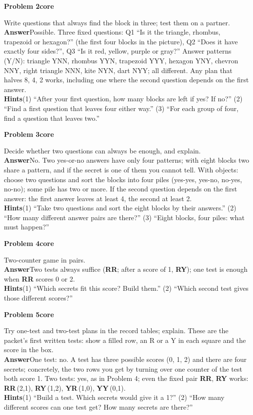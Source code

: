 \documentclass[11pt]{article}
\newcommand{\cd}[1]{\mbox{\textsf{\textbf{#1}}}}   %
\newcommand{\core}{\textcolor{tagcore}{\textbf{core}}}
\newcommand{\pb}[3]{\par\needspace{5\baselineskip}\medskip\textbf{Problem #1}\enspace{\small page #2}\enspace\textperiodcentered\enspace #3\par\nopagebreak}
\newcommand{\lab}[1]{\textbf{#1}\enspace}
\newcommand{\hints}[1]{\lab{Hints}#1}
\begin{document}
\pb{2}{2}{\core}
Write questions that always find the block in three; test them on a partner.\\
\lab{Answer}Possible. Three fixed questions: Q1 ``Is it the triangle, rhombus, trapezoid or hexagon?'' (the first four blocks in the picture), Q2 ``Does it have exactly four sides?'', Q3 ``Is it red, yellow, purple or gray?'' Answer patterns (Y/N): triangle YNN, rhombus YYN, trapezoid YYY, hexagon YNY, chevron NNY, right triangle NNN, kite NYN, dart NYY; all different. Any plan that halves 8, 4, 2 works, including one where the second question depends on the first answer.\\
\hints{(1) ``After your first question, how many blocks are left if yes? If no?'' (2) ``Find a first question that leaves four either way.'' (3) ``For each group of four, find a question that leaves two.''}

\pb{3}{2}{\core}
Decide whether two questions can always be enough, and explain.\\
\lab{Answer}No. Two yes-or-no answers have only four patterns; with eight blocks two share a pattern, and if the secret is one of them you cannot tell. With objects: choose two questions and sort the blocks into four piles (yes-yes, yes-no, no-yes, no-no); some pile has two or more. If the second question depends on the first answer: the first answer leaves at least 4, the second at least 2.\\
\hints{(1) ``Take two questions and sort the eight blocks by their answers.'' (2) ``How many different answer pairs are there?'' (3) ``Eight blocks, four piles: what must happen?''}

\pb{4}{3}{\core}
Two-counter game in pairs.\\
\lab{Answer}Two tests always suffice (\cd{RR}; after a score of 1, \cd{RY}); one test is enough when \cd{RR} scores 0 or 2.\\
\hints{(1) ``Which secrets fit this score? Build them.'' (2) ``Which second test gives those different scores?''}

\pb{5}{4}{\core}
Try one-test and two-test plans in the record tables; explain. These are the packet's first written tests: show a filled row, an R or a Y in each square and the score in the box.\\
\lab{Answer}One test: no. A test has three possible scores (0, 1, 2) and there are four secrets; concretely, the two rows you get by turning over one counter of the test both score 1. Two tests: yes, as in Problem 4; even the fixed pair \cd{RR}, \cd{RY} works: \cd{RR}\,(2,1), \cd{RY}\,(1,2), \cd{YR}\,(1,0), \cd{YY}\,(0,1).\\
\hints{(1) ``Build a test. Which secrets would give it a 1?'' (2) ``How many different scores can one test get? How many secrets are there?''}
\end{document}
